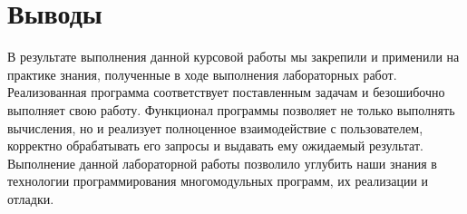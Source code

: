 \section{Выводы}

В результате выполнения данной курсовой работы 
мы закрепили и применили на практике знания, 
полученные в ходе выполнения лабораторных работ. 
Реализованная программа соответствует поставленным задачам 
и безошибочно выполняет свою работу. 
Функционал программы позволяет не только выполнять вычисления, 
но и реализует полноценное взаимодействие с пользователем, 
корректно обрабатывать его запросы и выдавать ему ожидаемый результат. 
Выполнение данной лабораторной работы позволило углубить наши знания 
в технологии программирования многомодульных программ, их реализации 
и отладки.